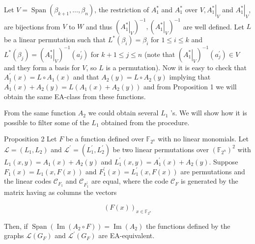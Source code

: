 \documentclass[10pt]{article}
\begin{document}
Let $V=\operatorname{Span}\left(\beta_{k+1}, \ldots, \beta_{n}\right)$, the restriction of $A_{1}^{*}$ and $A_{1}^{*}$ over $V,\left.A_{1}^{*}\right|_{V}$ and $\left.A_{1}^{*}\right|_{V}$, are bijections from $V$ to $W$ and thus $\left(\left.A_{1}^{*}\right|_{V}\right)^{-1},\left(\left.A_{1}^{*}\right|_{V}\right)^{-1}$ are well defined. Let $L$ be a linear permutation such that $L^{*}\left(\beta_{i}\right)=\beta_{i}$ for $1 \leq i \leq k$ and $L^{*}\left(\beta_{j}\right)=\left(\left.A_{1}^{*}\right|_{V}\right)^{-1}\left(a_{j}^{\prime}\right)$ for $k+1 \leq j \leq n$ (note that $\left(\left.A_{1}^{*}\right|_{V}\right)^{-1}\left(a_{j}^{\prime}\right) \in V$ and they form a basis for $V$, so $L$ is a permutation). Now it is easy to check that $A_{1}^{\prime}(x)=L \circ A_{1}(x)$ and that $A_{2}(y)=L \circ A_{2}(y)$ implying that $A_{1}^{\prime}(x)+A_{2}(y)=L\left(A_{1}(x)+A_{2}(y)\right)$ and from Proposition 1 we will obtain the same EA-class from these functions.

From the same function $A_{2}$ we could obtain several $L_{1}$ 's. We will show how it is possible to filter some of the $L_{1}$ obtained from the procedure.

Proposition 2 Let $F$ be a function defined over $\mathbb{F}_{2^{n}}$ with no linear monomials. Let $\mathscr{L}= \left(L_{1}, L_{2}\right)$ and $\mathscr{L}^{\prime}=\left(L_{1}^{\prime}, L_{2}^{\prime}\right)$ be two linear permutations over $\left(\mathbb{F}_{2^{n}}\right)^{2}$ with $L_{1}(x, y)= A_{1}(x)+A_{2}(y)$ and $L_{1}^{\prime}(x, y)=A_{1}^{\prime}(x)+A_{2}(y)$. Suppose $F_{1}(x)=L_{1}(x, F(x))$ and $F_{1}^{\prime}(x)= L_{1}^{\prime}(x, F(x))$ are permutations and the linear codes $\mathscr{C}_{F_{1}}$ and $\mathscr{C}_{F_{1}^{\prime}}$ are equal, where the code $\mathscr{C}_{F}$ is generated by the matrix having as columns the vectors

$$
(F(x))_{x \in \mathbb{F}_{2^{n}}}
$$

Then, if $\operatorname{Span}\left(\operatorname{Im}\left(A_{2} \circ F\right)\right)=\operatorname{Im}\left(A_{2}\right)$ the functions defined by the graphs $\mathscr{L}\left(G_{F}\right)$ and $\mathscr{L}^{\prime}\left(G_{F}\right)$ are EA-equivalent.
\end{document}
